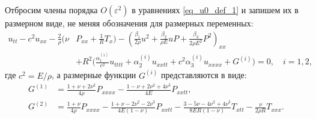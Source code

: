 \documentclass[12pt, a4paper]{report}
\begin{document}
Отбросим члены порядка $O(\varepsilon^2)$ в уравнениях \eqref{eq_u0_def_1} и запишем их в размерном виде, не меняя обозначения для размерных переменных:
\begin{equation}\label{eq_dim}
\begin{split}
u_{tt} - c^2 u_{xx} - \frac{2}{\rho}\bigg(\nu&P_{xx} + \frac1R T_x\bigg) - \left(\frac{\beta_1}{2\rho} u^2 + \frac{\beta_2}{\rho E} u P + \frac{\beta_3}{2\rho E^2} P^2\right)_{xx}\\
& + R^2 \bigg(\frac{\alpha_1^{(i)}}{c^2} u_{tttt} + \alpha_2^{(i)} u_{xxtt} + c^2\alpha_3^{(i)} u_{xxxx} + G^{(i)} \bigg) = 0, \quad i = 1,2,
\end{split}
\end{equation}
где $c^2 = E/\rho$, а размерные функции $G^{(i)}$ представляются в виде:
\begin{align}
G^{(1)} &= \frac{1 + \nu + 2\nu^2}{4\rho} P_{xxxx} - \frac{1 - \nu + 2\nu^2 + 4\nu^3}{4E} P_{xxtt}, \label{G1}\\
G^{(2)} &= \frac{1 + \nu}{4\rho} P_{xxxx} - \frac{1 + \nu - 2\nu^2 - 2\nu^3}{4E(1 - \nu)} P_{xxtt} - \frac{3 - 5\nu - 4\nu^2 + 4\nu^3}{8ER(1 - \nu)} T_{xtt} - \frac{\nu}{2\rho R} T_{xxx}. \label{G2}
\end{align}
\end{document}
